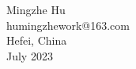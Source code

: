 \documentclass[a4paper]{article}
\begin{document}

% 
% 
% 
% 
% 


\noindent
\\
\\
Mingzhe Hu\\
humingzhework@163.com\\
Hefei, China\\
July 2023
\end{document}
